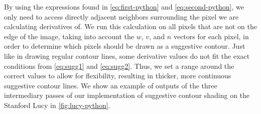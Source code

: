 \documentclass[10pt,twocolumn,letterpaper]{article}
\begin{document}
By using the expressions found in \cref{eq:first-python} and \cref{eq:second-python}, we only need to access directly adjacent neighbors surrounding the pixel we are calculating derivatives of. We run this calculation on all pixels that are not on the edge of the image, taking into account the $w$, $v$, and $n$ vectors for each pixel, in order to determine which pixels should be drawn as a suggestive contour. Just like in drawing regular contour lines, some derivative values do not fit the exact conditions from \cref{eq:sugg1} and \cref{eq:sugg2}. Thus, we set a range around the correct values to allow for flexibility, resulting in thicker, more continuous suggestive contour lines. We show an example of outputs of the three intermediary passes of our implementation of suggestive contour shading on the Stanford Lucy in \cref{fig:lucy-python}.
\end{document}

